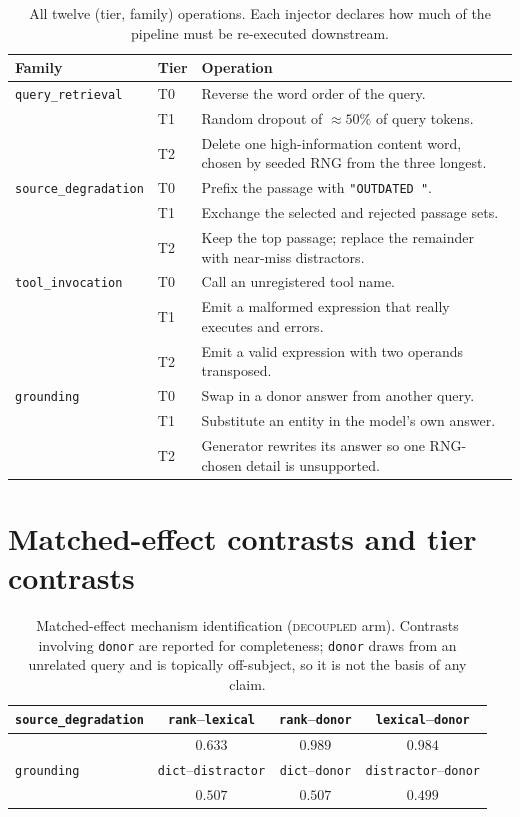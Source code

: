 \documentclass{article}
\begin{document}
\begin{table}[h]
\centering\small
\caption{All twelve (tier, family) operations. Each injector declares how much of the pipeline
must be re-executed downstream.}
\begin{tabular}{@{}llp{7.6cm}@{}}
\toprule
Family & Tier & Operation \\
\midrule
\texttt{query\_retrieval} & T0 & Reverse the word order of the query. \\
 & T1 & Random dropout of $\approx 50\%$ of query tokens. \\
 & T2 & Delete one high-information content word, chosen by seeded RNG from the three longest. \\
\midrule
\texttt{source\_degradation} & T0 & Prefix the passage with \texttt{"OUTDATED "}. \\
 & T1 & Exchange the selected and rejected passage sets. \\
 & T2 & Keep the top passage; replace the remainder with near-miss distractors. \\
\midrule
\texttt{tool\_invocation} & T0 & Call an unregistered tool name. \\
 & T1 & Emit a malformed expression that really executes and errors. \\
 & T2 & Emit a valid expression with two operands transposed. \\
\midrule
\texttt{grounding} & T0 & Swap in a donor answer from another query. \\
 & T1 & Substitute an entity in the model's own answer. \\
 & T2 & Generator rewrites its answer so one RNG-chosen detail is unsupported. \\
\bottomrule
\end{tabular}
\end{table}

\section{Matched-effect contrasts and tier contrasts}
\label{app:matched}

\begin{table}[h]
\centering\small
\caption{Matched-effect mechanism identification (\textsc{decoupled} arm). Contrasts involving
\texttt{donor} are reported for completeness; \texttt{donor} draws from an unrelated query and
is topically off-subject, so it is not the basis of any claim.}
\begin{tabular}{@{}lccc@{}}
\toprule
\texttt{source\_degradation} & \texttt{rank}--\texttt{lexical} & \texttt{rank}--\texttt{donor} & \texttt{lexical}--\texttt{donor} \\
\midrule
 & $\mathbf{0.633}$ & $0.989$ & $0.984$ \\
\midrule
\texttt{grounding} & \texttt{dict}--\texttt{distractor} & \texttt{dict}--\texttt{donor} & \texttt{distractor}--\texttt{donor} \\
 & $0.507$ & $0.507$ & $0.499$ \\
\bottomrule
\end{tabular}
\end{table}
\end{document}
